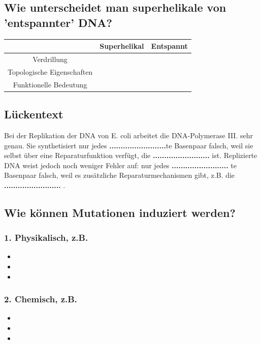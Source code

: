 \documentclass{article}
\begin{document}
\subsection*{Wie unterscheidet man superhelikale von 'entspannter' DNA?}
\begin{table}[H]
    \centering
    \begin{tabular}{|c||p{5cm}|p{5cm}|} \hline 
         & Superhelikal & Entspannt  \\ \hline\hline
        Verdrillung&& \\ \hline
        Topologische Eigenschaften&& \\ \hline
        Funktionelle Bedeutung && \\ \hline
    \end{tabular}
    \label{tab:my_label}
\end{table} 
\subsection*{Lückentext}
Bei der Replikation der DNA von E. coli arbeitet die DNA-Polymerase III. sehr genau. Sie synthetisiert nur jedes \textbf{.........................}te Basenpaar falsch, weil sie selbst über eine Reparaturfunktion verfügt, die \textbf{.........................}  ist. \newline
Replizierte DNA weist jedoch noch weniger Fehler auf: nur jedes \textbf{.........................}  te Basenpaar falsch, weil es zusätzliche Reparaturmechanismen gibt, z.B. die \textbf{.........................} .

\subsection*{Wie können Mutationen induziert werden?}
\subsubsection*{1. Physikalisch, z.B.} 
    
    \begin{itemize}
    \item 
    \item 
    \item
\end{itemize}
\subsubsection*{2. Chemisch, z.B.} 
\bigskip\bigskip
\begin{itemize}
    \item 
    \item 
    \item 
\end{itemize}
\end{document}
